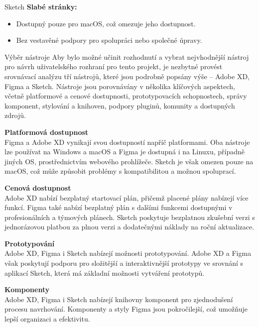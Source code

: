 \begin{subsection}{Sketch}
    \textbf{Slabé stránky:}
    \begin{itemize}
        \item Dostupný pouze pro macOS, což omezuje jeho dostupnost.
        \item Bez vestavěné podpory pro spolupráci nebo společné úpravy\cite{w_industry_the_ultimate_battle_figma_vs_sketch_vs_adobe_xd, sketch}.
    \end{itemize}
\end{subsection}

\begin{subsection}{Výběr nástroje}
    \label{subsec:navrh-ui-nastroje-vyber}
    Aby bylo možné učinit rozhodnutí a vybrat nejvhodnější nástroj pro návrh uživatelského rozhraní pro tento projekt, je nezbytné provést srovnávací analýzu tří nástrojů, které jsou podrobně popsány výše – Adobe XD, Figma a Sketch.
    Nástroje jsou porovnávány v několika klíčových aspektech, včetně platformové a cenové dostupnosti, prototypovacích schopnostech, správy komponent, stylování a knihoven, podpory pluginů, komunity a dostupných zdrojů.

    \textbf{Platformová dostupnost}\\
    Figma a Adobe XD vynikají svou dostupností napříč platformami.
    Oba nástroje lze používat na Windows a macOS a Figma je dostupná i na Linuxu, případně jiných OS, prostřednictvím webového prohlížeče.
    Sketch je však omezen pouze na macOS, což může způsobit problémy s kompatibilitou a možnou spoluprací.

    \textbf{Cenová dostupnost}\\
    Adobe XD nabízí bezplatný startovací plán, přičemž placené plány nabízejí více funkcí.
    Figma také nabízí bezplatný plán s dalšími funkcemi dostupnými v profesionálních a týmových plánech.
    Sketch poskytuje bezplatnou zkušební verzi s jednorázovou platbou za plnou verzi a dodatečnými náklady na roční aktualizace.

    \textbf{Prototypování}\\
    Adobe XD, Figma i Sketch nabízejí možnosti prototypování.
    Adobe XD a Figma však poskytují podporu pro složitější a interaktivnější prototypy ve srovnání s aplikací Sketch, která má základní možnosti vytváření prototypů.

    \textbf{Komponenty}\\
    Adobe XD, Figma i Sketch nabízejí knihovny komponent pro zjednodušení procesu navrhování.
    Komponenty a styly Figma jsou pokročilejší, což umožňuje lepší organizaci a efektivitu.


\end{subsection}

